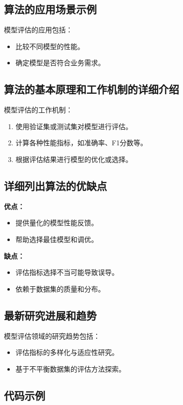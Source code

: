 \subsection*{算法的应用场景示例}
模型评估的应用包括：
\begin{itemize}
    \item 比较不同模型的性能。
    \item 确定模型是否符合业务需求。
\end{itemize}

\subsection*{算法的基本原理和工作机制的详细介绍}
模型评估的工作机制：
\begin{enumerate}
    \item 使用验证集或测试集对模型进行评估。
    \item 计算各种性能指标，如准确率、F1分数等。
    \item 根据评估结果进行模型的优化或选择。
\end{enumerate}

\subsection*{详细列出算法的优缺点}
\textbf{优点：}
\begin{itemize}
    \item 提供量化的模型性能反馈。
    \item 帮助选择最佳模型和调优。
\end{itemize}

\textbf{缺点：}
\begin{itemize}
    \item 评估指标选择不当可能导致误导。
    \item 依赖于数据集的质量和分布。
\end{itemize}

\subsection*{最新研究进展和趋势}
模型评估领域的研究趋势包括：
\begin{itemize}
    \item 评估指标的多样化与适应性研究。
    \item 基于不平衡数据集的评估方法探索。
\end{itemize}
\subsection*{代码示例}
\begin{lstlisting}

\end{lstlisting}



